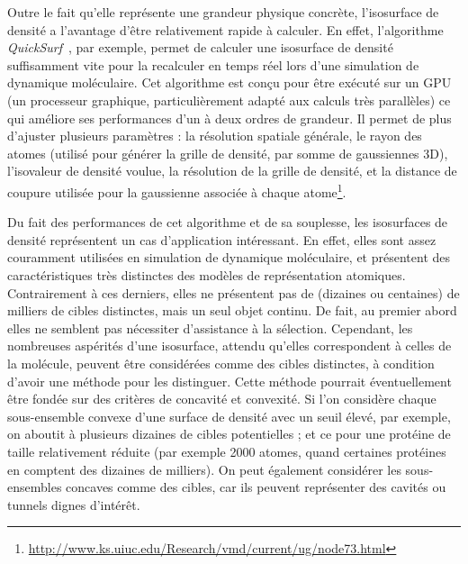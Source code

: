 	Outre le fait qu'elle représente une grandeur physique concrète, l'isosurface de densité a l'avantage d'être relativement rapide à calculer. En effet, l'algorithme \emph{QuickSurf}~\cite{krone2012fast, roberts2013lattice, stone2013early, stone2013gpu, stone2014gpu, sener2014visualization}, par exemple, permet de calculer une isosurface de densité suffisamment vite pour la recalculer en temps réel lors d'une simulation de dynamique moléculaire. Cet algorithme est conçu pour être exécuté sur un GPU (un processeur graphique, particulièrement adapté aux calculs très parallèles) ce qui améliore ses performances d'un à deux ordres de grandeur. Il permet de plus d'ajuster plusieurs paramètres : la résolution spatiale générale, le rayon des atomes (utilisé pour générer la grille de densité, par somme de gaussiennes 3D), l'isovaleur de densité voulue, la résolution de la grille de densité, et la distance de coupure utilisée pour la gaussienne associée à chaque atome\footnote{\url{http://www.ks.uiuc.edu/Research/vmd/current/ug/node73.html}}.
	
	Du fait des performances de cet algorithme et de sa souplesse, les isosurfaces de densité représentent un cas d'application intéressant. En effet, elles sont assez couramment utilisées en simulation de dynamique moléculaire, et présentent des caractéristiques très distinctes des modèles de représentation atomiques. Contrairement à ces derniers, elles ne présentent pas de (dizaines ou centaines) de milliers de cibles distinctes, mais un seul objet continu. De fait, au premier abord elles ne semblent pas nécessiter d'assistance à la sélection. Cependant, les nombreuses aspérités d'une isosurface, attendu qu'elles correspondent à celles de la molécule, peuvent être considérées comme des cibles distinctes, à condition d'avoir une méthode pour les distinguer. Cette méthode pourrait éventuellement être fondée sur des critères de concavité et convexité. Si l'on considère chaque sous-ensemble convexe d'une surface de densité avec un seuil élevé, par exemple, on aboutit à plusieurs dizaines de cibles potentielles ; et ce pour une protéine de taille relativement réduite (par exemple 2000 atomes, quand certaines protéines en comptent des dizaines de milliers). On peut également considérer les sous-ensembles concaves comme des cibles, car ils peuvent représenter des cavités ou tunnels\footnotemark{} dignes d'intérêt.
	
	
